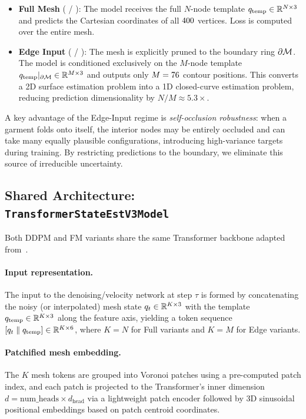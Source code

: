 \documentclass{article}
\begin{document}
\begin{itemize}
    \item \textbf{Full Mesh} (\fullddpm{} / \fullfm{}): The model receives the full $N$-node template $q_\mathrm{temp} \in \mathbb{R}^{N \times 3}$ and predicts the Cartesian coordinates of all $400$ vertices. Loss is computed over the entire mesh.
    \item \textbf{Edge Input} (\edgeddpm{} / \edgefm{}): The mesh is explicitly pruned to the boundary ring $\partial\mathcal{M}$. The model is conditioned exclusively on the $M$-node template $q_\mathrm{temp}|_{\partial\mathcal{M}} \in \mathbb{R}^{M \times 3}$ and outputs only $M = 76$ contour positions. This converts a 2D surface estimation problem into a 1D closed-curve estimation problem, reducing prediction dimensionality by $N/M \approx 5.3\times$.
\end{itemize}

A key advantage of the Edge-Input regime is \emph{self-occlusion robustness}: when a garment folds onto itself, the interior nodes may be entirely occluded and can take many equally plausible configurations, introducing high-variance targets during training. By restricting predictions to the boundary, we eliminate this source of irreducible uncertainty.

\subsection{Shared Architecture: \texttt{TransformerStateEstV3Model}}
\label{ssec:arch}

Both DDPM and FM variants share the same Transformer backbone adapted from~\cite{tian2025uniclothdiff}.

\paragraph{Input representation.}
The input to the denoising/velocity network at step $\tau$ is formed by concatenating the noisy (or interpolated) mesh state $q_t \in \mathbb{R}^{K \times 3}$ with the template $q_\mathrm{temp} \in \mathbb{R}^{K \times 3}$ along the feature axis, yielding a token sequence $[q_t \;\|\; q_\mathrm{temp}] \in \mathbb{R}^{K \times 6}$, where $K = N$ for Full variants and $K = M$ for Edge variants.

\paragraph{Patchified mesh embedding.}
The $K$ mesh tokens are grouped into Voronoi patches using a pre-computed patch index, and each patch is projected to the Transformer's inner dimension $d = \text{num\_heads} \times d_{\text{head}}$ via a lightweight patch encoder followed by 3D sinusoidal positional embeddings based on patch centroid coordinates.
\end{document}
